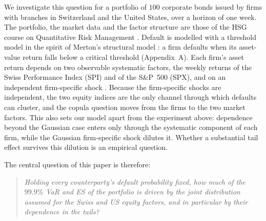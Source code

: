 We investigate this question for a portfolio of $100$ corporate bonds issued by firms with branches in Switzerland and the United States, over a horizon of one week. The portfolio, the market data and the factor structure are those of the HSG course on Quantitative Risk Management \citep{DeGiorgiFilkova26}. Default is modelled with a threshold model in the spirit of Merton's structural model \citep[Ch.~2]{DeGiorgi26}: a firm defaults when its asset-value return falls below a critical threshold (Appendix~A). Each firm's asset return depends on two observable systematic factors, the weekly returns of the Swiss Performance Index (SPI) and of the S\&P~500 (SPX), and on an independent firm-specific shock \citep[Sect.~3]{DeGiorgiFilkova26}. Because the firm-specific shocks are independent, the two equity indices are the only channel through which defaults can cluster, and the copula question moves from the firms to the two market factors. This also sets our model apart from the experiment above: dependence beyond the Gaussian case enters only through the systematic component of each firm, while the Gaussian firm-specific shock dilutes it. Whether a substantial tail effect survives this dilution is an empirical question.

The central question of this paper is therefore:
\begin{quote}
\itshape Holding every counterparty's default probability fixed, how much of the $99.9\%$ VaR and ES of the portfolio is driven by the joint distribution assumed for the Swiss and US equity factors, and in particular by their dependence in the tails?
\end{quote}
